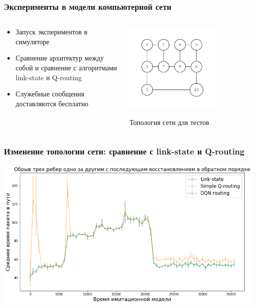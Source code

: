 \documentclass{beamer}
\begin{document}
\begin{frame}
  \frametitle{Эксперименты в модели компьютерной сети}
  \begin{columns}
    \begin{column}{0.6\textwidth}
      \begin{itemize}
      \item Запуск экспериментов в симуляторе
      \item Сравнение архитектур между собой и сравнение с алгоритмами link-state и Q-routing
      \item Служебные сообщения доставляются бесплатно
      \end{itemize}
    \end{column}
    \begin{column}{0.4\textwidth}
      \begin{center}
        \includegraphics[width=0.7\textwidth]{graph-2}

        Топология сети для тестов
      \end{center}
    \end{column}
  \end{columns}
\end{frame}


\begin{frame}
  \frametitle{Изменение топологии сети: сравнение с link-state и Q-routing}
  \includegraphics[width=\textwidth]{experiment-link-failures} 
\end{frame}
\end{document}
